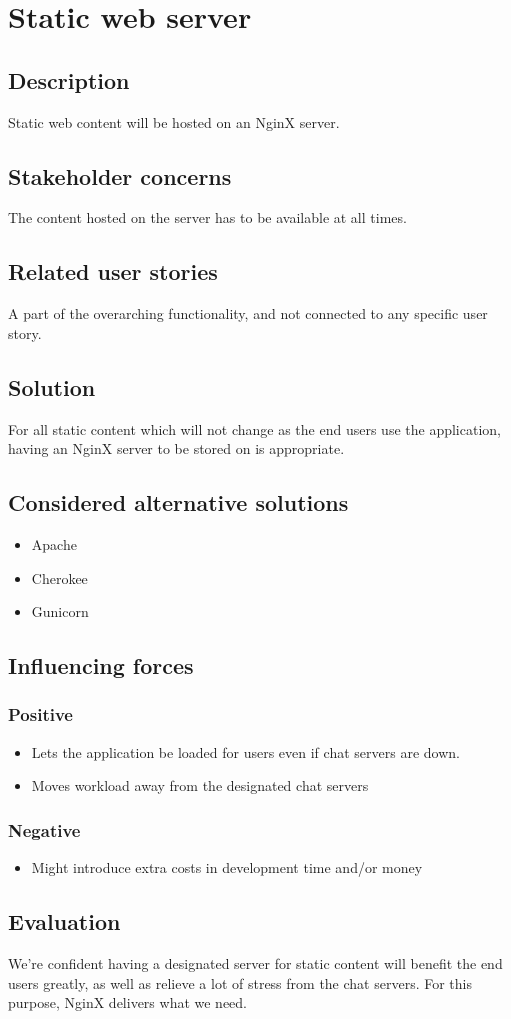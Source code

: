 \documentclass[12pt, a4paper]{article}
\begin{document}
\newpage
\section{Static web server} %
\subsection{Description}
Static web content will be hosted on an NginX server.
\subsection{Stakeholder concerns}
The content hosted on the server has to be available at all times.
\subsection{Related user stories}
A part of the overarching functionality, and not connected to any specific user story.
\subsection{Solution}
For all static content which will not change as the end users use the application, having an NginX server to be stored on is appropriate.
\subsection{Considered alternative solutions}
\begin{itemize}
    \item Apache
    \item Cherokee
    \item Gunicorn
\end{itemize}
\subsection{Influencing forces}
\begin{minipage}[t]{0.5\textwidth}
    \subsubsection*{Positive}
    \begin{itemize}
        \item Lets the application be loaded for users even if chat servers are down.
        \item Moves workload away from the designated chat servers
    \end{itemize}
\end{minipage}%
\begin{minipage}[t]{0.5\textwidth}
    \subsubsection*{Negative}
    \begin{itemize}
        \item Might introduce extra costs in development time and/or money
    \end{itemize}
\end{minipage}
\subsection{Evaluation}
We're confident having a designated server for static content will benefit the end users greatly, as well as relieve a lot of stress from the chat servers.
For this purpose, NginX delivers what we need.
\end{document}
